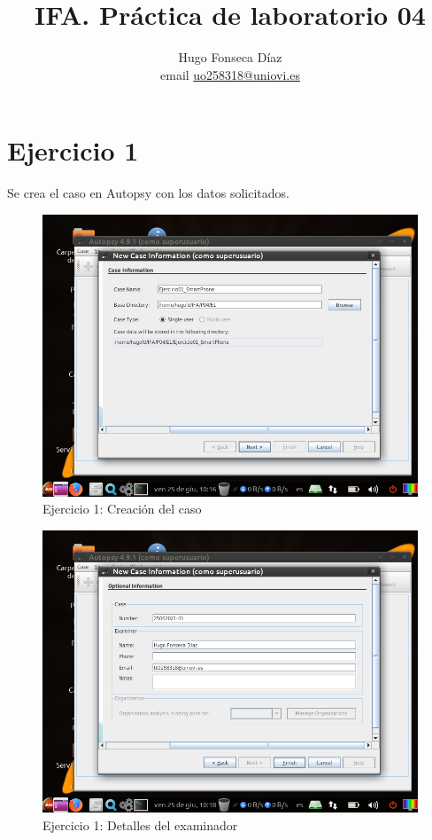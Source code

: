 \documentclass[11pt]{article}
\begin{document}
\title{IFA. Práctica de laboratorio 04}

\author{Hugo Fonseca Díaz \\ email \href{mailto:uo258318@uniovi.es}{uo258318@uniovi.es}}

\maketitle

\section{Ejercicio 1}
Se crea el caso en Autopsy con los datos solicitados.

\begin{figure}[H]
    \caption{Ejercicio 1: Creación del caso}
    \centering
    \includegraphics[scale=0.7]{e1-1.png}
\end{figure}

\begin{figure}[H]
    \caption{Ejercicio 1: Detalles del examinador}
    \centering
    \includegraphics[scale=0.7]{e1-2.png}
\end{figure}
\end{document}
